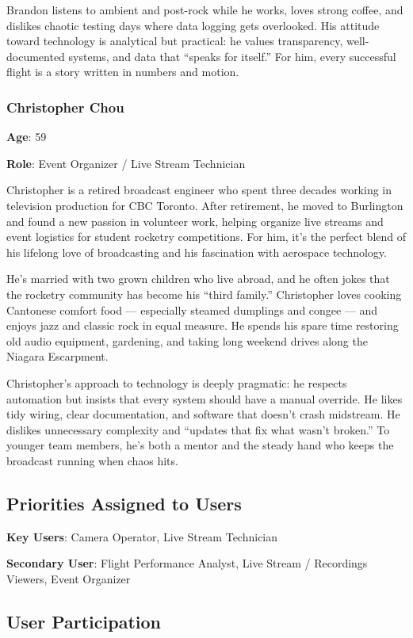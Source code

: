 \documentclass[12pt]{article}
\begin{document}
Brandon listens to ambient and post-rock while he works, loves strong coffee,
and dislikes chaotic testing days where data logging gets overlooked. His
attitude toward technology is analytical but practical: he values transparency,
well-documented systems, and data that “speaks for itself.” For him, every
successful flight is a story written in numbers and motion.

\subsubsection*{Christopher Chou}

\textbf{Age}: 59

\textbf{Role}: Event Organizer / Live Stream Technician

Christopher is a retired broadcast engineer who spent three decades working in
television production for CBC Toronto. After retirement, he moved to Burlington
and found a new passion in volunteer work, helping organize live streams and
event logistics for student rocketry competitions. For him, it's the perfect
blend of his lifelong love of broadcasting and his fascination with aerospace
technology.

He's married with two grown children who live abroad, and he often jokes that
the rocketry community has become his “third family.” Christopher loves cooking
Cantonese comfort food — especially steamed dumplings and congee — and enjoys
jazz and classic rock in equal measure. He spends his spare time restoring old
audio equipment, gardening, and taking long weekend drives along the Niagara
Escarpment.

Christopher's approach to technology is deeply pragmatic: he respects
automation but insists that every system should have a manual override. He
likes tidy wiring, clear documentation, and software that doesn't crash
midstream. He dislikes unnecessary complexity and “updates that fix what wasn't
broken.” To younger team members, he's both a mentor and the steady hand who
keeps the broadcast running when chaos hits.
\subsection{Priorities Assigned to Users}

\textbf{Key Users}: Camera Operator, Live Stream Technician

\textbf{Secondary User}: Flight Performance Analyst, Live Stream / Recordings Viewers, Event Organizer

\subsection{User Participation}
\end{document}
